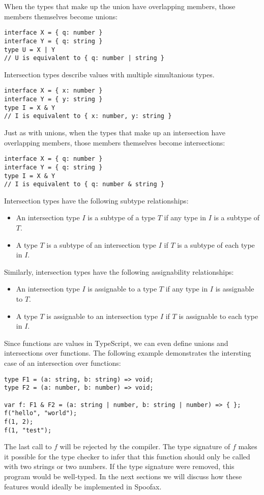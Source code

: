 When the types that make up the union have overlapping members, those members themselves become unions:
\begin{lstlisting}
interface X = { q: number }
interface Y = { q: string }
type U = X | Y
// U is equivalent to { q: number | string }
\end{lstlisting}
\bigskip
Intersection types describe values with multiple simultanious types. 
\begin{lstlisting}
interface X = { x: number }
interface Y = { y: string }
type I = X & Y
// I is equivalent to { x: number, y: string }
\end{lstlisting}

Just as with unions, when the types that make up an intersection have overlapping members, those members themselves become intersections:
\begin{lstlisting}
interface X = { q: number }
interface Y = { q: string }
type I = X & Y
// I is equivalent to { q: number & string }
\end{lstlisting}

Intersection types have the following subtype relationships:
\begin{itemize}
\item An intersection type $I$ is a subtype of a type $T$ if any type in $I$ is a subtype of $T$.
\item A type $T$ is a subtype of an intersection type $I$ if $T$ is a subtype of each type in $I$.
\end{itemize}
Similarly, intersection types have the following assignability relationships:
\begin{itemize}
\item An intersection type $I$ is assignable to a type $T$ if any type in $I$ is assignable to $T$.
\item A type $T$ is assignable to an intersection type $I$ if $T$ is assignable to each type in $I$.
\end{itemize}
\bigskip
Since functions are values in TypeScript, we can even define unions and intersections over functions.
The following example demonstrates the intersting case of an intersection over functions:
\begin{lstlisting}
type F1 = (a: string, b: string) => void;  
type F2 = (a: number, b: number) => void;

var f: F1 & F2 = (a: string | number, b: string | number) => { };  
f("hello", "world");
f(1, 2);
f(1, "test");
\end{lstlisting}

The last call to $f$ will be rejected by the compiler.
The type signature of $f$ makes it possible for the type checker to infer
that this function should only be called with two strings or two numbers.
If the type signature were removed, this program would be well-typed.
\bigskip
In the next sections we will discuss how these features would ideally be implemented in Spoofax.

